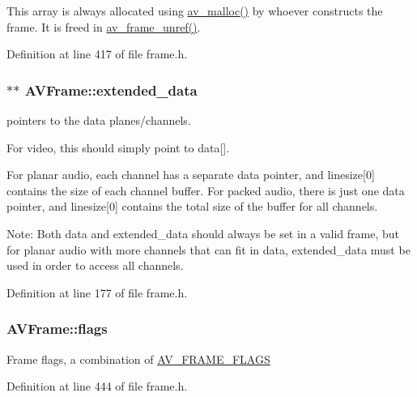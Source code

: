 This array is always allocated using \hyperlink{group__lavu__mem_gacbca30ebc510a7e4156d66e7aceb2dc8}{av\+\_\+malloc()} by whoever constructs the frame. It is freed in \hyperlink{group__lavu__frame_ga0a2b687f9c1c5ed0089b01fd61227108}{av\+\_\+frame\+\_\+unref()}. 

Definition at line 417 of file frame.\+h.

\subsubsection[{\texorpdfstring{extended\+\_\+data}{extended_data}}]{$\ast$$\ast$ A\+V\+Frame\+::extended\+\_\+data}\hypertarget{struct_a_v_frame_afca04d808393822625e09b5ba91c6756}{}\label{struct_a_v_frame_afca04d808393822625e09b5ba91c6756}
pointers to the data planes/channels.

For video, this should simply point to data\mbox{[}\mbox{]}.

For planar audio, each channel has a separate data pointer, and linesize\mbox{[}0\mbox{]} contains the size of each channel buffer. For packed audio, there is just one data pointer, and linesize\mbox{[}0\mbox{]} contains the total size of the buffer for all channels.

Note\+: Both data and extended\+\_\+data should always be set in a valid frame, but for planar audio with more channels that can fit in data, extended\+\_\+data must be used in order to access all channels. 

Definition at line 177 of file frame.\+h.

\subsubsection[{\texorpdfstring{flags}{flags}}]{ A\+V\+Frame\+::flags}\hypertarget{struct_a_v_frame_a49020cc320b8fb1f5449167b6c97515b}{}\label{struct_a_v_frame_a49020cc320b8fb1f5449167b6c97515b}
Frame flags, a combination of \hyperlink{group__lavu__frame__flags}{A\+V\+\_\+\+F\+R\+A\+M\+E\+\_\+\+F\+L\+A\+GS} 

Definition at line 444 of file frame.\+h.

